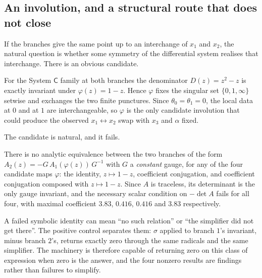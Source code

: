 \subsection{An involution, and a structural route that does not
close}\label{ssec:involution}

If the branches give the same point up to an interchange of $x_1$ and $x_2$,
the natural question is whether some symmetry of the differential system
realises that interchange. There is an obvious candidate.

\begin{remark}
For the System $\mathsf C$ family at both branches the denominator
$D(z)=z^2-z$ is exactly invariant under $\varphi(z)=1-z$. Hence $\varphi$ fixes
the singular set $\{0,1,\infty\}$ setwise and exchanges the two finite
punctures. Since $\theta_0=\theta_1=0$, the local data at $0$ and at $1$ are
interchangeable, so $\varphi$ is the only candidate involution that could
produce the observed $x_1\leftrightarrow x_2$ swap with $x_3$ and $\alpha$
fixed.
\end{remark}

The candidate is natural, and it fails.

\begin{remark}
There is no analytic equivalence between the two branches of the form
$A_2(z)=-G\,A_1(\varphi(z))\,G^{-1}$ with $G$ a \emph{constant} gauge, for any
of the four candidate maps $\varphi$: the identity, $z\mapsto1-z$, coefficient
conjugation, and coefficient conjugation composed with $z\mapsto1-z$. Since $A$
is traceless, its determinant is the only gauge invariant, and the necessary
scalar condition on $-\det A$ fails for all four, with maximal coefficient
$3.83$, $0.416$, $0.416$ and $3.83$ respectively.
\end{remark}

\begin{remark}
A failed symbolic identity can mean ``no such relation'' or ``the simplifier
did not get there''. The positive control separates them: $\sigma$ applied to
branch $1$'s invariant, minus branch $2$'s, returns exactly zero through the
same radicals and the same simplifier. The machinery is therefore capable of
returning zero on this class of expression when zero is the answer, and the
four nonzero results are findings rather than failures to simplify.
\end{remark}


